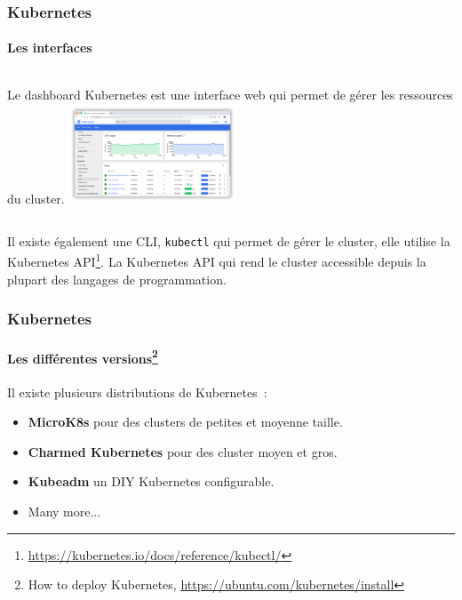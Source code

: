 \documentclass{beamer}
\begin{document}
    \begin{frame}
        \transdissolve
        \frametitle{Kubernetes}
        \framesubtitle{Les interfaces}
        \begin{columns}
            Le dashboard Kubernetes est une interface web qui permet de gérer les ressources du cluster\footnotemark.
            \centering
            \includegraphics[width=5cm]{image/kubernetes-dashboard.png}
        \end{columns}
        \flushleft
        \bigbreak
        Il existe également une CLI, \lstinline{kubectl} qui permet de gérer le cluster, elle utilise la Kubernetes API\footnote{\url{https://kubernetes.io/docs/reference/kubectl/}}.
        \bigbreak
        La Kubernetes API qui rend le cluster accessible depuis la plupart des langages de programmation.
    \end{frame}

    \begin{frame}
        \transdissolve
        \frametitle{Kubernetes}
        \framesubtitle{Les différentes versions\footnote{How to deploy Kubernetes, \url{https://ubuntu.com/kubernetes/install}}}
        Il existe plusieurs distributions de Kubernetes~:
        \begin{itemize}
            \item \textbf{MicroK8s} pour des clusters de petites et moyenne taille.
            \item \textbf{Charmed Kubernetes} pour des cluster moyen et gros.
            \item \textbf{Kubeadm} un DIY Kubernetes configurable.
            \item Many more...
        \end{itemize}
    \end{frame}
\end{document}

